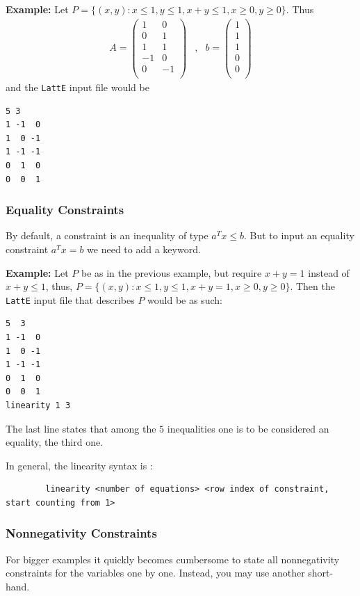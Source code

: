 \documentclass{article}
\newcommand{\example}{{\bf Example:\space}}
\begin{document}
\example
Let $P=\{(x,y): x\leq 1, y\leq 1, x+y\leq 1, x\geq 0, y\geq 0\}$.
Thus
\[
\begin{array}{ccc}
A=\left(
\begin{array}{rr} 
 1 &  0 \\ 
 0 &  1 \\ 
 1 &  1 \\
-1 &  0 \\ 
 0 & -1 \\ 
\end{array} 
\right) 
& , &
b = \left( 
\begin{array}{r} 
1 \\ 
1 \\ 
1 \\ 
0 \\
0 \\ 
\end{array} 
\right)
\end{array}
\]
and the {\tt LattE} input file would be
\begin{verbatim}
5 3
1 -1  0
1  0 -1
1 -1 -1
0  1  0
0  0  1
\end{verbatim}

\subsubsection{Equality Constraints}

By default, a constraint is an inequality of type $a^Tx\leq b$. But to input an equality constraint $a^Tx=b$ we need to add a keyword.

\example
Let $P$ be as in the previous example, but require $x+y=1$ instead of
$x+y\leq 1$, thus, 
$P=\{(x,y): x\leq 1, y\leq 1, x+y=1, x\geq 0, y\geq 0\}$.
Then the {\tt LattE} input file that describes $P$ would be as such:
\begin{verbatim}
5  3
1 -1  0
1  0 -1
1 -1 -1
0  1  0
0  0  1
linearity 1 3
\end{verbatim}
The last line states that among the $5$ inequalities one is to be
considered an equality, the third one.

In general, the linearity syntax is :
\begin{verbatim}
        linearity <number of equations> <row index of constraint, start counting from 1>
\end{verbatim}

\subsubsection{Nonnegativity Constraints}
For bigger examples it quickly becomes cumbersome to state all
nonnegativity constraints for the variables one by one. Instead, you
may use another short-hand.
\end{document}
